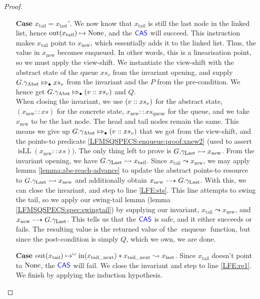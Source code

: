 \documentclass[a4paper, 10pt]{report}
\theoremstyle{definition}
\newcommand{\enqueue}{\operatorname{enqueue}}
\newcommand{\xsc}{xs}
\newcommand{\xsqueue}{xs_{\mathrm{queue}}}
\newcommand{\isLL}{\operatorname{isLL}}
\newcommand{\nIn}[1]{\operatorname{in}(#1)}
\newcommand{\nOut}[1]{\operatorname{out}(#1)}
\newcommand{\node}{x}
\newcommand{\nodeN}[1]{\node_{\mathrm{#1}}}
\newcommand{\nodetail}{\nodeN{tail}}
\newcommand{\nodelast}{\nodeN{last}}
\newcommand{\nodenew}{\nodeN{new}}
\newcommand{\nodetailnext}{\nodeN{tail\_next}}
\newcommand{\absvalue}{\val}
\newcommand{\absvalueList}{xs_v}
\newcommand{\Qg}{G}
\newcommand{\gabst}{\gname_{\mathrm{Abst}}}
\newcommand{\glast}{\gname_{\mathrm{Last}}}
\newcommand{\abstractstateauth}[2]{#1 \Mapsto_{\bullet} #2}
\newcommand{\reach}[2]{#1 \leadsto #2}
\newcommand{\ar}[2]{#1 \dashrightarrow #2}
\newcommand{\ap}[2]{#1 \rightarrowtail #2}
\begin{document}
\begin{proof}
\begin{itemize}
\begin{itemize}
      \item[\textbf{Case}]
      $\nodetail = \nodelast'$. We now know that $\nodetail$ is still the last node in the linked list, hence $\nOut{\nodetail} \mapsto \None$, and the $\textsf{\color{blue} CAS}$ will succeed. This instruction makes $\nodetail$ point to $\nodenew$, which essentially adds it to the linked list. Thus, the value in $\nodenew$ becomes enqueued. In other words, this is a linearisation point, so we must apply the view-shift. We instantiate the view-shift with the abstract state of the queue $\absvalueList$ from the invariant opening, and supply $\abstractstateauth{\Qg.\gabst}{\absvalueList}$ from the invariant and the $P$ from the pre-condition. We hence get $\abstractstateauth{\Qg.\gabst}{(\absvalue :: \absvalueList)}$ and $Q$.\\
      When closing the invariant, we use $(\absvalue :: \absvalueList)$ for the abstract state, $(\nodenew :: \xsc)$ for the concrete state, $\nodenew :: \xsqueue$ for the queue, and we take $\nodenew$ to be the last node. The head and tail nodes remain the same. This means we give up $\abstractstateauth{\Qg.\gabst}{(\absvalue :: \absvalueList)}$ that we got from the view-shift, and the points-to predicate \ref{LFMSQSPECS:enqueue:proof:xnew2} (used to assert $\isLL (\nodenew :: \xsc))$. The only thing left to prove is $\ap{\Qg.\glast}{\nodenew}$. From the invariant opening, we have $\ap{\Qg.\glast}{\nodetail}$. Since $\reach{\nodetail}{\nodenew}$, we may apply lemma \ref{lemma:abs-reach-advance} to update the abstract points-to resource to $\ap{\Qg.\glast}{\nodenew}$ and additionally obtain $\ar{\nodenew}{\Qg.\glast}$. With this, we can close the invariant, and step to line \ref{LFE:sts}. This line attempts to swing the tail, so we apply our swing-tail lemma (lemma \ref{LFMSQSPECS:spec:swingtail}) by supplying our invariant, $\reach{\nodetail}{\nodenew}$, and $\ar{\nodenew}{\Qg.\glast}$. This tells us that the $\textsf{\color{blue} CAS}$ is safe, and it either succeeds or fails. The resulting value is the returned value of the $\enqueue$ function, but since the post-condition is simply $Q$, which we own, we are done.

      \item[\textbf{Case}]
      $\nOut{\nodetail} \mapsto^{\persistently} \nIn{\nodetailnext} \star{} \reach{\nodetailnext}{\nodelast}$. Since $\nodetail$ doesn't point to $\operatorname{None}$, the $\textsf{\color{blue} CAS}$ will fail. We close the invariant and step to line \ref{LFE:re1}. We finish by applying the induction hypothesis.
    \end{itemize}


\end{itemize}
\end{proof}
\end{document}
